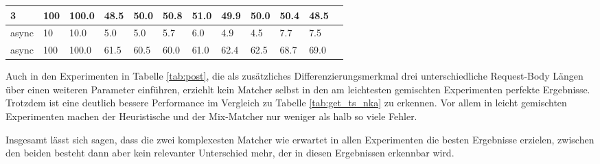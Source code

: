 \documentclass[12pt,a4paper]{report}
\begin{document}
\begin{table}[h]
\begin{tabular}{|l|l|l|l|l|l|l|l|l|l|l|l|}
		3                        & 100                                & 100.0                           & 48.5                        & 50.0                      & 50.8                           & 51.0   & 49.9 & 50.0   & 50.4 & 48.5   \\ \hline
		async                    & 10                                 & 10.0                            & 5.0                         & 5.0                       & 5.7                            & 6.0    & 4.9  & 4.5    & 7.7  & 7.5    \\ \hline
		async                    & 100                                & 100.0                           & 61.5                        & 60.5                      & 60.0                           & 61.0   & 62.4 & 62.5   & 68.7 & 69.0   \\ \hline
	\end{tabular}
\end{table}

Auch in den Experimenten in Tabelle \ref{tab:post}, die als zusätzliches Differenzierungsmerkmal drei unterschiedliche
Request-Body Längen über einen weiteren Parameter einführen, erziehlt kein Matcher selbst in den am leichtesten gemischten
Experimenten perfekte Ergebnisse. Trotzdem ist eine deutlich bessere Performance im Vergleich zu Tabelle \ref{tab:get_ts_nka} zu
erkennen. Vor allem in leicht gemischten Experimenten machen der Heuristische und der Mix-Matcher nur weniger als halb so viele
Fehler.

Insgesamt lässt sich sagen, dass die zwei komplexesten Matcher wie erwartet in allen Experimenten die besten Ergebnisse erzielen,
zwischen den beiden besteht dann aber kein relevanter Unterschied mehr, der in diesen Ergebnissen erkennbar wird. 
\end{document}
